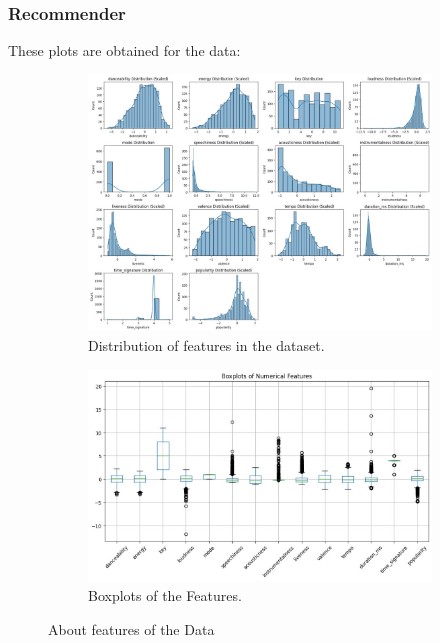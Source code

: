 \documentclass[a4paper, 24pt]{article}
\begin{document}
\subsubsection{Recommender}
These plots are obtained for the data:
\begin{figure}[H]
    \centering
    \begin{subfigure}{0.45\textwidth}
        \centering
        \includegraphics[width=\textwidth]{WhatsApp Image 2024-04-21 at 01.14.08_a32b0b26.jpg}
        \caption{Distribution of features in the dataset.}
        \label{fig:Feature_Distribution of Recommender Data}
    \end{subfigure}
    \hfill
    \begin{subfigure}{0.45\textwidth}
        \centering
        \includegraphics[width=\textwidth]{WhatsApp Image 2024-04-21 at 01.14.32_3b467a5e.jpg}
        \caption{Boxplots of the Features.}
        \label{fig:Boxplots_recmonnd}
    \end{subfigure}
    \caption{About features of the Data}
    \label{fig:combined_plots1}
\end{figure}
\end{document}
